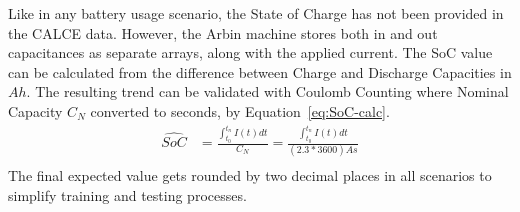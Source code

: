 %
Like in any battery usage scenario, the State of Charge has not been provided in the CALCE data.
However, the Arbin machine stores both in and out capacitances as separate arrays, along with the applied current.
The SoC value can be calculated from the difference between Charge and Discharge Capacities in $Ah$.
The resulting trend can be validated with Coulomb Counting where Nominal Capacity $C_{N}$ converted to seconds, by \mbox{Equation~\ref{eq:SoC-calc}}.
\begin{equation}
    \begin{split}
        \hat{SoC} &= \frac{\int_{t_0}^{t_n} I(t)dt} {C_{N}} = \frac{\int_{t_0}^{t_n} I(t)dt} {(2.3*3600)As} \\
        \label{eq:SoC-calc}
    \end{split}
\end{equation}
The final expected value gets rounded by two decimal places in all scenarios to simplify training and testing processes.

